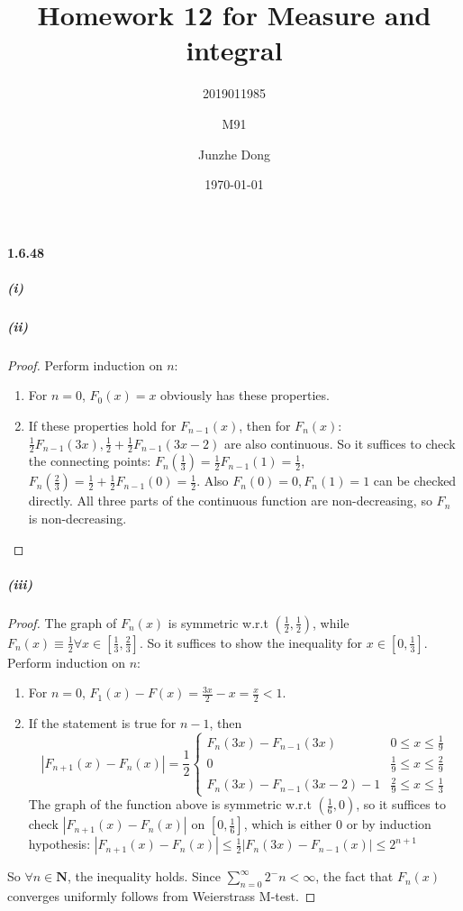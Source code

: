 \documentclass{article}
\title{Homework 12 for Measure and integral}
\author{2019011985\and M91\and Junzhe Dong}
\date{\today}
\begin{document}
\maketitle

\newcommand{\st}{\text{ s.t. }}
\newcommand{\R}{\mathbf{R}}
\newcommand{\dd}{\,\mathrm{d}}
\newcommand{\sip}{\mathrm{Simp}}

\paragraph{1.6.48}
\subparagraph{(i)}
\subparagraph{(ii)}
\begin{proof}
Perform induction on $n$:
\begin{enumerate}
\item For $n=0$, $F_0(x)=x$ obviously has these properties.

\item If these properties hold for $F_{n-1}(x)$, then for $F_n(x)$: $\frac 1 2F_{n-1}(3x), \frac 1 2+\frac 1 2F_{n-1}(3x-2)$ are also continuous. So it suffices to check the connecting points: $F_n(\frac 1 3)=\frac 1 2 F_{n-1}(1)=\frac 1 2$, $F_n(\frac 2 3)=\frac 1 2+\frac 1 2 F_{n-1}(0)=\frac 1 2$. Also $F_n(0)=0, F_n(1)=1$ can be checked directly. All three parts of the continuous function are non-decreasing, so $F_n$ is non-decreasing.
\end{enumerate}
\end{proof}
\subparagraph{(iii)}
\begin{proof}
The graph of $F_n(x)$ is symmetric w.r.t $(\frac 1 2, \frac 1 2)$, while $F_n(x)\equiv \frac 1 2\forall x\in [\frac 1 3,\frac 2 3]$. So it suffices to show the inequality for $x\in [0,\frac 1 3]$. Perform induction on $n$:
\begin{enumerate}
\item For $n=0$, $F_1(x)-F(x)=\frac {3x}{2}-x=\frac{x}{2}<1$. 
\item If the statement is true for $n-1$, then 
\[|F_{n+1}(x)-F_n(x)|=\frac 1 2\begin{cases}F_n(3x)-F_{n-1}(3x)& 0\leq x\leq \frac 1 9\\0&\frac 1 9\leq x\leq \frac 2 9\\ F_n(3x)-F_{n-1}(3x-2)-1&\frac 2 9\leq x\leq \frac 1 3 \end{cases}\]
The graph of the function above is symmetric w.r.t $(\frac 1 6,0)$, so it suffices to check $|F_{n+1}(x)-F_n(x)|$ on $[0, \frac 1 6]$, which is either $0$ or by induction hypothesis: $|F_{n+1}(x)-F_n(x)|\leq \frac 1 2|F_n(3x)-F_{n-1}(x)|\leq 2^{n+1}$
\end{enumerate}
So $\forall n\in\mathbf{N}$, the inequality holds. Since $\sum\limits_{n=0}^\infty 2^-n<\infty$, the fact that $F_n(x)$ converges uniformly follows from Weierstrass M-test.
\end{proof}
\end{document}
